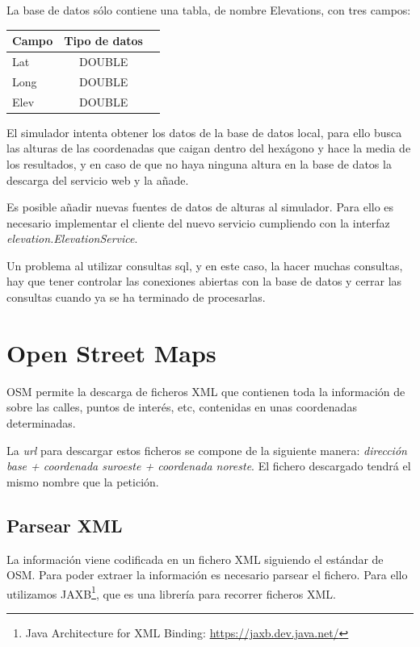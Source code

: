 La base de datos sólo contiene una tabla, de nombre Elevations, con tres campos:

\begin{center}
\begin{tabular}{ | l | c | r | }
\hline
{\bf Campo} & {\bf Tipo de datos} \\ \hline
Lat & DOUBLE \\ \hline
Long & DOUBLE \\ \hline
Elev & DOUBLE \\ \hline
\end{tabular}
\end{center}

El simulador intenta obtener los datos de la base de datos local, para ello
busca las alturas de las coordenadas que caigan dentro del hexágono y hace la
media de los resultados, y en caso de que no haya ninguna altura en la base de
datos la descarga del servicio web y la añade.

Es posible añadir nuevas fuentes de datos de alturas al simulador. Para ello es
necesario implementar el cliente del nuevo servicio cumpliendo con la interfaz
{\em elevation.ElevationService}.

Un problema al utilizar consultas sql, y en este caso, la hacer muchas
consultas, hay que tener controlar las conexiones abiertas con la base de datos
y cerrar las consultas cuando ya se ha terminado de procesarlas.

\section*{Open Street Maps}

OSM permite la descarga de ficheros XML que contienen toda la información de
sobre las calles, puntos de interés, etc, contenidas en unas coordenadas
determinadas.

La {\em url} para descargar estos ficheros se compone de la siguiente manera: 
{\em dirección base + coordenada suroeste + coordenada noreste}. El fichero
descargado tendrá el mismo nombre que la petición.

\subsection*{Parsear XML}

La información viene codificada en un fichero XML siguiendo el estándar de OSM.
Para poder extraer la información es necesario parsear el fichero. Para ello
utilizamos JAXB\footnote{Java Architecture for XML Binding: 
\url{https://jaxb.dev.java.net/}}, que es una librería para recorrer ficheros
XML. 

